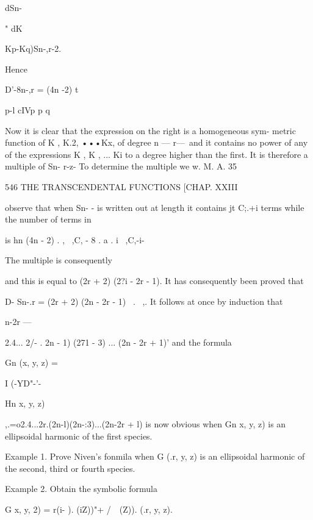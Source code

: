 {{dSn-

" dK



 Kp-Kq)Sn-,r-2.



Hence



D'-8n-,r = (4n -2) t






p-l cIVp p q



Now it is clear that the expression on the right is a homogeneous sym-
metric function of K , K.2, •••Kx, of degree n — r—\, and it contains
no power of any of the expressions K , K , ... Ki to a degree higher
than the first. It is therefore a multiple of Sn- r-z- To determine
the multiple we w. M. A. 35



546 THE TRANSCENDENTAL FUNCTIONS [CHAP. XXIII

observe that when Sn- - is written out at length it contains jt C;.+i
terms while the number of terms in

is hn (4n - 2) . , \ ,C, - 8 . a . i \ ,C,-i-

The multiple is consequently

and this is equal to (2r + 2) (2?i - 2r - 1). It has consequently been
proved that

D- Sn-.r = (2r + 2) (2n - 2r - 1) \ . \ ,. It follows at once by
induction that



 n-2r —



2.4... 2/- . 2n - 1) (271 - 3) ... (2n - 2r + 1)' and the formula



Gn (x, y, z) =



I (-YD"-'-



Hn x, y, z)



,.=o2.4...2r.(2n-l)(2n-:3)...(2n-2r + l) is now obvious when Gn x, y,
z) is an ellipsoidal harmonic of the first species.

Example 1. Prove Niven's fonmila when G (.r, y, z) is an ellipsoidal
harmonic of the second, third or fourth species.

Example 2. Obtain the symbolic formula

G x, y, 2) = r(i- ). (iZ))"+ /\ \ (Z)). (.r, y, z).

}}
